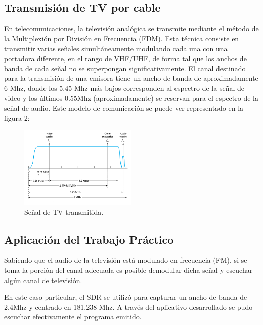 \documentclass[10pt,a4paper]{article}
\begin{document}
\subsection{Transmisión de TV por cable}

En telecomunicaciones, la televisión analógica se transmite mediante
el método de la Multiplexión por División en Frecuencia (FDM). Esta
técnica consiste en transmitir varias señales simultáneamente modulando
cada una con una portadora diferente, en el rango de VHF/UHF, de forma
tal que los anchos de banda de cada señal no se superpongan significativamente.
El canal destinado para la transmisión de una emisora tiene un ancho
de banda de aproximadamente 6 Mhz, donde los 5.45 Mhz más bajos corresponden
al espectro de la señal de video y los últimos 0.55Mhz (aproximadamente)
se reservan para el espectro de la señal de audio. Este modelo de
comunicación se puede ver representado en la figura 2:

\begin{figure}
\begin{centering}
\includegraphics[width=0.5\textwidth]{Imagenes/TV_Spectrum.png}
\par\end{centering}
\caption{Señal de TV transmitida.}
\end{figure}



\subsection{Aplicación del Trabajo Práctico}

Sabiendo que el audio de la televisión está modulado en frecuencia
(FM), si se toma la porción del canal adecuada es posible demodular
dicha señal y escuchar algún canal de televisión.

En este caso particular, el SDR se utilizó para capturar un ancho
de banda de 2.4Mhz y centrado en 181.238 Mhz. A través del aplicativo
desarrollado se pudo escuchar efectivamente el programa emitido.
\end{document}
